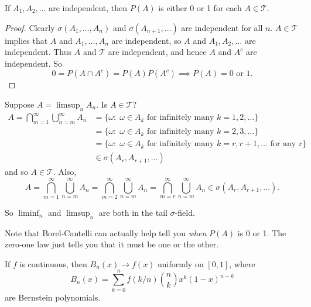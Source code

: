\documentclass[11pt,fleqn]{book} %
\begin{document}
\begin{theorem} \label{thm:zero-one}
	If $A_1,A_2,\dots$ are independent, then $P(A)$ is either 0 or 1 for each $A \in \mathcal{T}$.
\end{theorem}

\begin{proof}
	Clearly $\sigma(A_1,\dots,A_n)$ and $\sigma(A_{n+1},\dots)$ are independent for all $n$. $A \in \mathcal{T}$ implies that $A$ and $A_1,\dots,A_n$ are independent, so $A$ and $A_1,A_2,\dots$ are independent. Thus $A$ and $\mathcal{T}$ are independent, and hence $A$ and $A^c$ are independent. So
	\[
		0 = P(A \cap A^c) = P(A)P(A^c) \implies P(A) = 0 \textrm{ or } 1.
	\]
\end{proof}

Suppose $A = \limsup_n A_n$. Is $A \in \mathcal{T}$?
\begin{align*}
	A = \bigcap_{m=1}^\infty \bigcup_{n=m}^\infty A_n &= \{\omega:\;\omega \in A_k \textrm{ for infinitely many } k=1,2,\dots\} \\
	&= \{\omega:\;\omega \in A_k \textrm{ for infinitely many } k=2,3,\dots\} \\
	&= \{\omega:\;\omega \in A_k \textrm{ for infinitely many } k=r,r+1,\dots \textrm{ for any } r\} \\
	&\in \sigma(A_r,A_{r+1},\dots)
\end{align*}
and so $A \in \mathcal{T}$. Also,
\[
	A = \bigcap_{m=1}^\infty \bigcup_{n=m}^\infty A_n = \bigcap_{m=2}^\infty \bigcup_{n=m}^\infty A_n = \bigcap_{m=r}^\infty \bigcup_{n=m}^\infty A_n \in \sigma(A_r,A_{r+1},\dots).
\]

So $\liminf_n$ and $\limsup_n$ are both in the tail $\sigma$-field.

Note that Borel-Cantelli can actually help tell you \emph{when} $P(A)$ is 0 or 1. The zero-one law just tells you that it must be one or the other.

\begin{theorem} \label{thm:bernstein}
	If $f$ is continuous, then $B_n(x) \to f(x)$ uniformly on $[0,1]$, where
	\[
		B_n(x) = \sum_{k=0}^n f(k/n) \binom{n}{k} x^k (1-x)^{n-k}
	\]
	are Bernstein polynomials.
\end{theorem}
\end{document}
